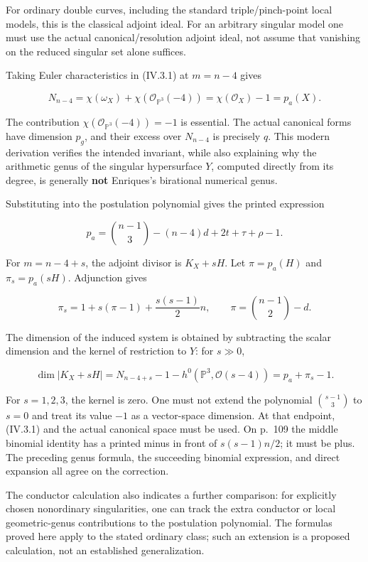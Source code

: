 For ordinary double curves, including the standard triple/pinch-point local models, this is the classical adjoint ideal. For an arbitrary singular model one must use the actual canonical/resolution adjoint ideal, not assume that vanishing on the reduced singular set alone suffices.

Taking Euler characteristics in (IV.3.1) at \(m=n-4\) gives

\[
 N_{n-4}=\chi(\omega_X)+\chi(\mathcal O_{\mathbb P^3}(-4))
 =\chi(\mathcal O_X)-1=p_a(X).
\]

The contribution \(\chi(\mathcal O_{\mathbb P^3}(-4))=-1\) is essential. The actual canonical forms have dimension \(p_g\), and their excess over \(N_{n-4}\) is precisely \(q\). This modern derivation verifies the intended invariant, while also explaining why the arithmetic genus of the singular hypersurface \(Y\), computed directly from its degree, is generally \textbf{not} Enriques's birational numerical genus.

Substituting into the postulation polynomial gives the printed expression

\[
 p_a=\binom{n-1}{3}-(n-4)d+2t+\tau+\rho-1.
\]

For \(m=n-4+s\), the adjoint divisor is \(K_X+sH\). Let \(\pi=p_a(H)\) and \(\pi_s=p_a(sH)\). Adjunction gives

\[
 \pi_s=1+s(\pi-1)+\frac{s(s-1)}2n,
 \qquad\pi=\binom{n-1}{2}-d.
\]

The dimension of the induced system is obtained by subtracting the scalar dimension and the kernel of restriction to \(Y\): for \(s\gg0\),

\[
 \dim|K_X+sH|=N_{n-4+s}-1-h^0(\mathbb P^3,\mathcal O(s-4))
 =p_a+\pi_s-1.
\]

For \(s=1,2,3\), the kernel is zero. One must not extend the polynomial \(\binom{s-1}{3}\) to \(s=0\) and treat its value \(-1\) as a vector-space dimension. At that endpoint, (IV.3.1) and the actual canonical space must be used. On p.~109 the middle binomial identity has a printed minus in front of \(s(s-1)n/2\); it must be plus. The preceding genus formula, the succeeding binomial expression, and direct expansion all agree on the correction.

The conductor calculation also indicates a further comparison: for explicitly chosen nonordinary singularities, one can track the extra conductor or local geometric-genus contributions to the postulation polynomial. The formulas proved here apply to the stated ordinary class; such an extension is a proposed calculation, not an established generalization.

